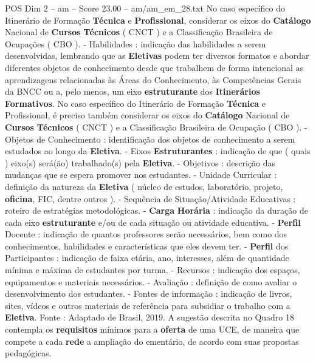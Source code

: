 \begin{textsample}{POS Dim 2 – am – Score 23.00 – am/am\_em\_28.txt}
No caso específico do Itinerário de Formação \textbf{Técnica} e \textbf{Profissional}, considerar os eixos do \textbf{Catálogo} Nacional de \textbf{Cursos} \textbf{Técnicos} ( CNCT ) e a Classificação Brasileira de Ocupações ( CBO ). - Habilidades : indicação das habilidades a serem desenvolvidas, lembrando que as \textbf{Eletivas} podem ter diversos formatos e abordar diferentes objetos de conhecimento desde que trabalhem de forma intencional as aprendizagens relacionadas às Áreas do Conhecimento, às Competências Gerais da BNCC ou a, pelo menos, um eixo \textbf{estruturante} dos \textbf{Itinerários} \textbf{Formativos}.
No caso específico do Itinerário de Formação \textbf{Técnica} e Profissional, é preciso também considerar os eixos do \textbf{Catálogo} Nacional de \textbf{Cursos} \textbf{Técnicos} ( CNCT ) e a Classificação Brasileira de Ocupação ( CBO ). - Objetos de Conhecimento : identificação dos objetos de conhecimento a serem estudados ao longo da \textbf{Eletiva}. - Eixos \textbf{Estruturantes} : indicação de que ( quais ) eixo(s) será(ão) trabalhado(s) pela \textbf{Eletiva}. - Objetivos : descrição das mudanças que se espera promover nos estudantes. - Unidade Curricular : definição da natureza da \textbf{Eletiva} ( núcleo de estudos, laboratório, projeto, \textbf{oficina}, FIC, dentre outros ). - Sequência de Situação/Atividade Educativas : roteiro de estratégias metodológicas. - \textbf{Carga} \textbf{Horária} : indicação da duração de cada eixo \textbf{estruturante} e/ou de cada situação ou atividade educativa. - \textbf{Perfil} Docente : indicação de quantos professores serão necessários, bem como dos conhecimentos, habilidades e características que eles devem ter. - \textbf{Perfil} dos Participantes : indicação de faixa etária, ano, interesses, além de quantidade mínima e máxima de estudantes por turma. - Recursos : indicação dos espaços, equipamentos e materiais necessários. - Avaliação : definição de como avaliar o desenvolvimento dos estudantes. - Fontes de informação : indicação de livros, sites, vídeos e outros materiais de referência para subsidiar o trabalho com a \textbf{Eletiva}.
Fonte : Adaptado de Brasil, 2019.
A sugestão descrita no Quadro 18 contempla os \textbf{requisitos} mínimos para a \textbf{oferta} de uma UCE, de maneira que compete a cada \textbf{rede} a ampliação do ementário, de acordo com suas propostas pedagógicas.

\end{textsample}

